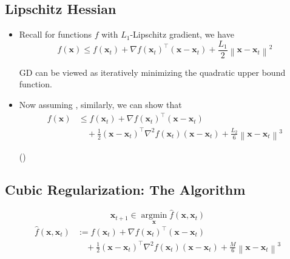 \subsection*{Lipschitz Hessian}
\begin{itemize}[leftmargin=*]
    \item Recall for functions $f$ with $L_{1}$-Lipschitz gradient, we have
$$
f(\mathbf{x}) \leq f\left(\mathbf{x}_{t}\right)+\nabla f\left(\mathbf{x}_{t}\right)^{\top}\left(\mathbf{x}-\mathbf{x}_{t}\right)+\frac{L_{1}}{2}\left\|\mathbf{x}-\mathbf{x}_{t}\right\|^{2}
$$

GD can be viewed as iteratively minimizing the quadratic upper bound function.
    \item Now assuming , similarly, we can show that
    $$
    \begin{aligned}
    f(\mathbf{x}) &\leq f\left(\mathbf{x}_{t}\right)+\nabla f\left(\mathbf{x}_{t}\right)^{\top}\left(\mathbf{x}-\mathbf{x}_{t}\right) \\
    &\quad +\frac{1}{2}\left(\mathbf{x}-\mathbf{x}_{t}\right)^{\top} \nabla^{2} f\left(\mathbf{x}_{t}\right)\left(\mathbf{x}-\mathbf{x}_{t}\right)+\frac{L_{2}}{6}\left\|\mathbf{x}-\mathbf{x}_{t}\right\|^{3}
    \end{aligned}
    $$

()
\end{itemize}





\subsection*{Cubic Regularization: The Algorithm}
$$\mathbf{x}_{t+1} \in \underset{\mathbf{x}}{\operatorname{argmin}} \hat{f}\left(\mathbf{x}, \mathbf{x}_{t}\right)$$
$$
\begin{aligned}
\hat{f}\left(\mathbf{x}, \mathbf{x}_{t}\right)&:=f\left(\mathbf{x}_{t}\right)+\nabla f\left(\mathbf{x}_{t}\right)^{\top}\left(\mathbf{x}-\mathbf{x}_{t}\right)\\
& \quad +\frac{1}{2}\left(\mathbf{x}-\mathbf{x}_{t}\right)^{\top} \nabla^{2} f\left(\mathbf{x}_{t}\right)\left(\mathbf{x}-\mathbf{x}_{t}\right)+\frac{M}{6}\left\|\mathbf{x}-\mathbf{x}_{t}\right\|^{3}
\end{aligned}
$$





